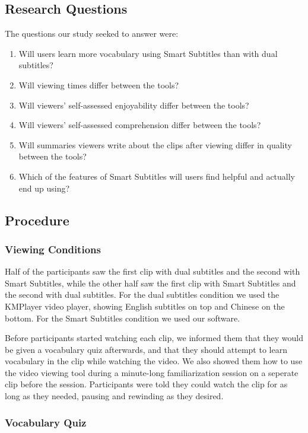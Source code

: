 \documentclass{sigchi}
\begin{document}
\subsection{Research Questions}

The questions our study seeked to answer were:

\begin{enumerate}[noitemsep]
\item Will users learn more vocabulary using Smart Subtitles than with dual subtitles?
\item Will viewing times differ between the tools?
\item Will viewers' self-assessed enjoyability differ between the tools?
\item Will viewers' self-assessed comprehension differ between the tools?
\item Will summaries viewers write about the clips after viewing differ in quality between the tools?
\item Which of the features of Smart Subtitles will users find helpful and actually end up using?
\end{enumerate}

\subsection{Procedure}

\subsubsection{Viewing Conditions}

Half of the participants saw the first clip with dual
subtitles and the second with Smart Subtitles, while the
other half saw the first clip with Smart Subtitles and
the second with dual subtitles.
For the dual subtitles
condition we used the KMPlayer video player, showing English subtitles
on top and Chinese on the bottom. For the Smart
Subtitles condition we used our software.

Before participants started watching each clip, we
informed them that they would be given a vocabulary
quiz afterwards, and that they should attempt to learn vocabulary
in the clip while watching the video. We also
showed them how to use the video viewing tool
during a minute-long familiarization session on a seperate clip
before the session. Participants were told 
they could watch the clip for as long as they
needed, pausing and rewinding as they desired.

\subsubsection{Vocabulary Quiz}
\end{document}

